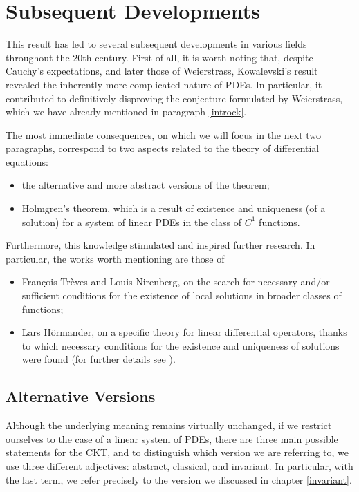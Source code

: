 \chapter{Subsequent Developments}

This result has led to several subsequent developments in various fields throughout the 20th century. First of all, it is worth noting that, despite Cauchy's expectations, and later those of Weierstrass, Kowalevski's result revealed the inherently more complicated nature of PDEs. In particular, it contributed to definitively disproving the conjecture formulated by Weierstrass, which we have already mentioned in paragraph \ref{introck}.

The most immediate consequences, on which we will focus in the next two paragraphs, correspond to two aspects related to the theory of differential equations:
\begin{itemize}
\item the alternative and more abstract versions of the theorem;
\item Holmgren's theorem, which is a result of existence and uniqueness (of a solution) for a system of linear PDEs in the class of $C^1$ functions.
\end{itemize}

Furthermore, this knowledge stimulated and inspired further research. In particular, the works worth mentioning are those of
\begin{itemize}
\item François Trèves and Louis Nirenberg, on the search for necessary and/or sufficient conditions for the existence of local solutions in broader classes of functions;
\item Lars Hörmander, on a specific theory for linear differential operators, thanks to which necessary conditions for the existence and uniqueness of solutions were found (for further details see \cite{Hormander}).
\end{itemize}

\newpage
\section{Alternative Versions}

Although the underlying meaning remains virtually unchanged, if we restrict ourselves to the case of a linear system of PDEs, there are three main possible statements for the CKT, and to distinguish which version we are referring to, we use three different adjectives: abstract, classical, and invariant. In particular, with the last term, we refer precisely to the version we discussed in chapter \ref{invariant}.

